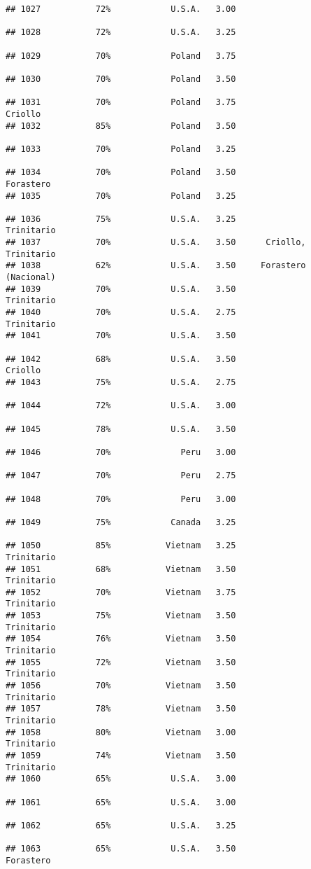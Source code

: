 \documentclass[
]{article}
\begin{document}
\begin{verbatim}
## 1027           72%            U.S.A.   3.00                         
## 1028           72%            U.S.A.   3.25                         
## 1029           70%            Poland   3.75                         
## 1030           70%            Poland   3.50                         
## 1031           70%            Poland   3.75                  Criollo
## 1032           85%            Poland   3.50                         
## 1033           70%            Poland   3.25                         
## 1034           70%            Poland   3.50                Forastero
## 1035           70%            Poland   3.25                         
## 1036           75%            U.S.A.   3.25               Trinitario
## 1037           70%            U.S.A.   3.50      Criollo, Trinitario
## 1038           62%            U.S.A.   3.50     Forastero (Nacional)
## 1039           70%            U.S.A.   3.50               Trinitario
## 1040           70%            U.S.A.   2.75               Trinitario
## 1041           70%            U.S.A.   3.50                         
## 1042           68%            U.S.A.   3.50                  Criollo
## 1043           75%            U.S.A.   2.75                         
## 1044           72%            U.S.A.   3.00                         
## 1045           78%            U.S.A.   3.50                         
## 1046           70%              Peru   3.00                         
## 1047           70%              Peru   2.75                         
## 1048           70%              Peru   3.00                         
## 1049           75%            Canada   3.25                         
## 1050           85%           Vietnam   3.25               Trinitario
## 1051           68%           Vietnam   3.50               Trinitario
## 1052           70%           Vietnam   3.75               Trinitario
## 1053           75%           Vietnam   3.50               Trinitario
## 1054           76%           Vietnam   3.50               Trinitario
## 1055           72%           Vietnam   3.50               Trinitario
## 1056           70%           Vietnam   3.50               Trinitario
## 1057           78%           Vietnam   3.50               Trinitario
## 1058           80%           Vietnam   3.00               Trinitario
## 1059           74%           Vietnam   3.50               Trinitario
## 1060           65%            U.S.A.   3.00                         
## 1061           65%            U.S.A.   3.00                         
## 1062           65%            U.S.A.   3.25                         
## 1063           65%            U.S.A.   3.50                Forastero

\end{verbatim}
\end{document}
